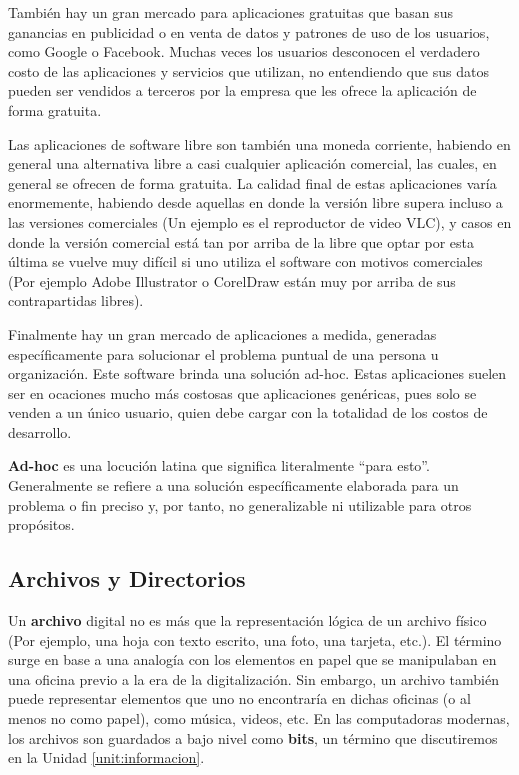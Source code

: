 También hay un gran mercado para aplicaciones gratuitas que basan sus ganancias
en publicidad o en venta de datos y patrones de uso de los usuarios, como Google
o Facebook. Muchas veces los usuarios desconocen el verdadero costo de las
aplicaciones y servicios que utilizan, no entendiendo que sus datos pueden ser
vendidos a terceros por la empresa que les ofrece la aplicación de forma
gratuita.

Las aplicaciones de software libre son también una moneda corriente, habiendo en
general una alternativa libre a casi cualquier aplicación comercial, las cuales,
en general se ofrecen de forma gratuita. La calidad final de estas aplicaciones
varía enormemente, habiendo desde aquellas en donde la versión libre supera
incluso a las versiones comerciales (Un ejemplo es el reproductor de video VLC),
y casos en donde la versión comercial está tan por arriba de la libre que optar
por esta última se vuelve muy difícil si uno utiliza el software con motivos
comerciales (Por ejemplo Adobe Illustrator o CorelDraw están muy por arriba de
sus contrapartidas libres).

Finalmente hay un gran mercado de aplicaciones a medida, generadas
específicamente para solucionar el problema puntual de una persona u
organización. Este software brinda una solución ad-hoc. Estas aplicaciones
suelen ser en ocaciones mucho más costosas que aplicaciones genéricas, pues solo
se venden a un único usuario, quien debe cargar con la totalidad de los costos
de desarrollo.

\begin{definition} \textbf{Ad-hoc} es una locución latina que
    significa literalmente ``para esto''. Generalmente se refiere a una solución
    específicamente elaborada para un problema o fin preciso y, por tanto, no
    generalizable ni utilizable para otros propósitos.
\end{definition}

\subsection{Archivos y Directorios}
\label{chap:computadoras:subsec:archivos}

Un \textbf{archivo} digital no es más que la representación lógica de un archivo
físico (Por ejemplo, una hoja con texto escrito, una foto, una tarjeta, etc.).
El término surge en base a una analogía con los elementos en papel que se
manipulaban en una oficina previo a la era de la digitalización. Sin embargo, un
archivo también puede representar elementos que uno no encontraría en dichas
oficinas (o al menos no como papel), como música, videos, etc. En las
computadoras modernas, los archivos son guardados a bajo nivel como
\textbf{bits}, un término que discutiremos en la Unidad \ref{unit:informacion}.

